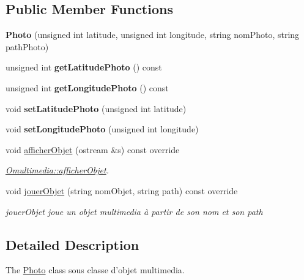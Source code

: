 \subsection*{Public Member Functions}
\begin{DoxyCompactItemize}
\item 
\hypertarget{class_photo_a4b68b4e4c551bbad82073932a0d3e800}{{\bfseries Photo} (unsigned int latitude, unsigned int longitude, string nom\+Photo, string path\+Photo)}\label{class_photo_a4b68b4e4c551bbad82073932a0d3e800}

\item 
\hypertarget{class_photo_a5d7841d5429264d5023baf921efd00b0}{unsigned int {\bfseries get\+Latitude\+Photo} () const }\label{class_photo_a5d7841d5429264d5023baf921efd00b0}

\item 
\hypertarget{class_photo_a081941cde635fe42bd017ef48b5f5ae6}{unsigned int {\bfseries get\+Longitude\+Photo} () const }\label{class_photo_a081941cde635fe42bd017ef48b5f5ae6}

\item 
\hypertarget{class_photo_aae3805bb2c61cb96cc11e7f09fe5bc1c}{void {\bfseries set\+Latitude\+Photo} (unsigned int latitude)}\label{class_photo_aae3805bb2c61cb96cc11e7f09fe5bc1c}

\item 
\hypertarget{class_photo_ab58d0b90b56098457653ffeddb1e03ff}{void {\bfseries set\+Longitude\+Photo} (unsigned int longitude)}\label{class_photo_ab58d0b90b56098457653ffeddb1e03ff}

\item 
void \hyperlink{class_photo_a6c80c6f056b2ec84cc30ad0afecd9806}{afficher\+Objet} (ostream \&s) const override
\begin{DoxyCompactList}\small\item\em \hyperlink{class_omultimedia_ae8942bb1db61d92962a71bbe7512c037}{Omultimedia\+::afficher\+Objet}. \end{DoxyCompactList}\item 
void \hyperlink{class_photo_a5b9e3f3f830c4fd02f930fee9dc8dfb2}{jouer\+Objet} (string nom\+Objet, string path) const override
\begin{DoxyCompactList}\small\item\em jouer\+Objet joue un objet multimedia à partir de son nom et son path \end{DoxyCompactList}\end{DoxyCompactItemize}


\subsection{Detailed Description}
The \hyperlink{class_photo}{Photo} class sous classe d'objet multimedia. 

